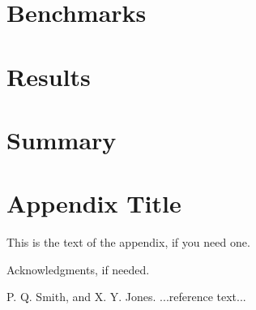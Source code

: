 \documentclass[preprint]{sigplanconf}
\begin{document}
\section{Benchmarks}

\section{Results}

\section{Summary}

\appendix
\section{Appendix Title}

This is the text of the appendix, if you need one.

\acks

Acknowledgments, if needed.





\begin{thebibliography}{}
\softraggedright

P. Q. Smith, and X. Y. Jones. ...reference text...

\end{thebibliography}
\end{document}
